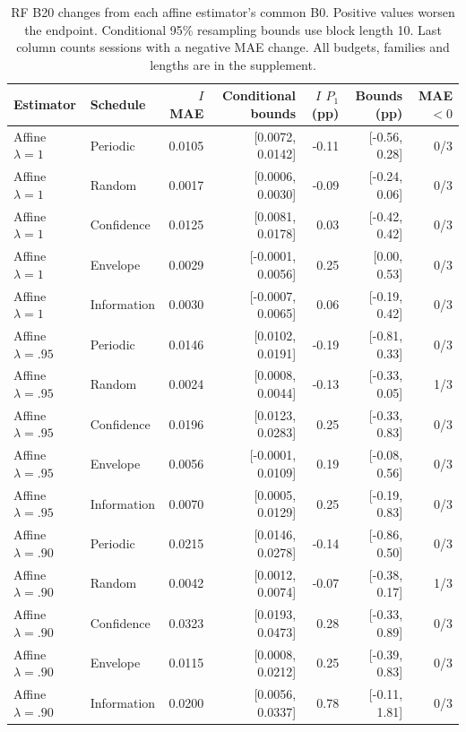 \begin{table}[H]\centering\small
\caption{RF B20 changes from each affine estimator's common B0. Positive values worsen the endpoint. Conditional 95\% resampling bounds use block length 10. Last column counts sessions with a negative MAE change. All budgets, families and lengths are in the supplement.}\label{tab:incremental}
\setlength{\tabcolsep}{4pt}\begin{tabular}{llrrrrr}
\toprule
Estimator & Schedule & $I$ MAE & Conditional bounds & $I$ $P_1$ (pp) & Bounds (pp) & MAE $<0$ \\ \midrule
Affine $\lambda=1$ & Periodic & 0.0105 & [0.0072, 0.0142] & -0.11 & [-0.56, 0.28] & 0/3 \\
Affine $\lambda=1$ & Random & 0.0017 & [0.0006, 0.0030] & -0.09 & [-0.24, 0.06] & 0/3 \\
Affine $\lambda=1$ & Confidence & 0.0125 & [0.0081, 0.0178] & 0.03 & [-0.42, 0.42] & 0/3 \\
Affine $\lambda=1$ & Envelope & 0.0029 & [-0.0001, 0.0056] & 0.25 & [0.00, 0.53] & 0/3 \\
Affine $\lambda=1$ & Information & 0.0030 & [-0.0007, 0.0065] & 0.06 & [-0.19, 0.42] & 0/3 \\
Affine $\lambda=.95$ & Periodic & 0.0146 & [0.0102, 0.0191] & -0.19 & [-0.81, 0.33] & 0/3 \\
Affine $\lambda=.95$ & Random & 0.0024 & [0.0008, 0.0044] & -0.13 & [-0.33, 0.05] & 1/3 \\
Affine $\lambda=.95$ & Confidence & 0.0196 & [0.0123, 0.0283] & 0.25 & [-0.33, 0.83] & 0/3 \\
Affine $\lambda=.95$ & Envelope & 0.0056 & [-0.0001, 0.0109] & 0.19 & [-0.08, 0.56] & 0/3 \\
Affine $\lambda=.95$ & Information & 0.0070 & [0.0005, 0.0129] & 0.25 & [-0.19, 0.83] & 0/3 \\
Affine $\lambda=.90$ & Periodic & 0.0215 & [0.0146, 0.0278] & -0.14 & [-0.86, 0.50] & 0/3 \\
Affine $\lambda=.90$ & Random & 0.0042 & [0.0012, 0.0074] & -0.07 & [-0.38, 0.17] & 1/3 \\
Affine $\lambda=.90$ & Confidence & 0.0323 & [0.0193, 0.0473] & 0.28 & [-0.33, 0.89] & 0/3 \\
Affine $\lambda=.90$ & Envelope & 0.0115 & [0.0008, 0.0212] & 0.25 & [-0.39, 0.83] & 0/3 \\
Affine $\lambda=.90$ & Information & 0.0200 & [0.0056, 0.0337] & 0.78 & [-0.11, 1.81] & 0/3 \\
\bottomrule\end{tabular}\end{table}
